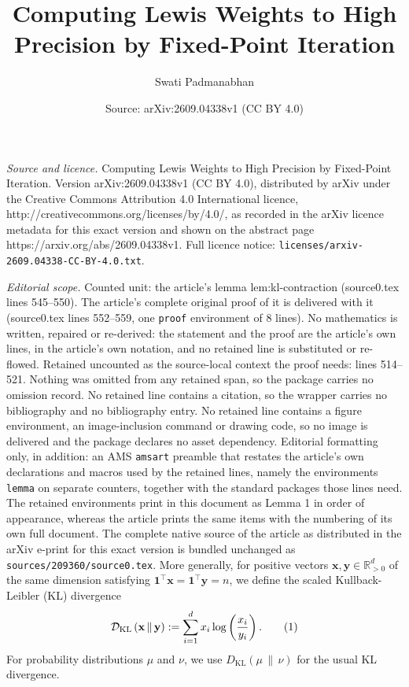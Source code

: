 \documentclass[10pt,a4paper]{amsart}
\title{Computing Lewis Weights to High Precision by Fixed-Point Iteration}
\author{Swati Padmanabhan}
\date{Source: arXiv:2609.04338v1 (CC BY 4.0)}
\newcommand{\KL}[2]{D_{\mathrm{KL}}\left(#1 \,\|\, #2\right)}
\newcommand{\R}{\mathbb{R}}
\newcommand{\bx}{\mathbf{x}}
\newcommand{\by}{\mathbf{y}}
\newcommand{\kldiv}[2]{\mathcal{D}_{\mathrm{KL}}\left(#1 \,\|\, #2\right)}
\newcommand\numberthis{\addtocounter{equation}{1}\tag{\theequation}}
\newcommand{\one}{\mathbf{1}}
\begin{document}
\maketitle

\noindent\emph{Source and licence.} Computing Lewis Weights to High Precision by Fixed-Point Iteration. Version arXiv:2609.04338v1 (CC BY 4.0), distributed by arXiv under the Creative Commons Attribution 4.0 International licence, http://creativecommons.org/licenses/by/4.0/, as recorded in the arXiv licence metadata for this exact version and shown on the abstract page https://arxiv.org/abs/2609.04338v1. Full licence notice: \texttt{licenses/arxiv-2609.04338-CC-BY-4.0.txt}.\par\smallskip

\noindent\textit{Editorial scope.} Counted unit: the article's lemma lem:kl-contraction (source0.tex lines 545--550). The article's complete original proof of it is delivered with it (source0.tex lines 552--559, one \texttt{proof} environment of 8 lines). No mathematics is written, repaired or re-derived: the statement and the proof are the article's own lines, in the article's own notation, and no retained line is substituted or re-flowed.  Retained uncounted as the source-local context the proof needs: lines 514--521.  Nothing was omitted from any retained span, so the package carries no omission record.  No retained line contains a citation, so the wrapper carries no bibliography and no bibliography entry.  No retained line contains a figure environment, an image-inclusion command or drawing code, so no image is delivered and the package declares no asset dependency.  Editorial formatting only, in addition: an AMS \texttt{amsart} preamble that restates the article's own declarations and macros used by the retained lines, namely the environments \texttt{lemma} on separate counters, together with the standard packages those lines need.  The retained environments print in this document as Lemma 1 in order of appearance, whereas the article prints the same items with the numbering of its own full document.  The complete native source of the article as distributed in the arXiv e-print for this exact version is bundled unchanged as \texttt{sources/209360/source0.tex}.
More generally, for positive vectors $\bx,\by\in\R_{>0}^d$ of the same dimension satisfying $\one^\top\bx=\one^\top\by=n$, we define the scaled Kullback-Leibler (KL) divergence
\[
\kldiv{\bx}{\by}
:=
\sum_{i=1}^d x_i\log\left(\frac{x_i}{y_i}\right).
\numberthis\label{eq:notation-KLdiv}
\]
For probability distributions $\mu$ and $\nu$, we use $\KL{\mu}{\nu}$ for the usual KL divergence.
\end{document}

